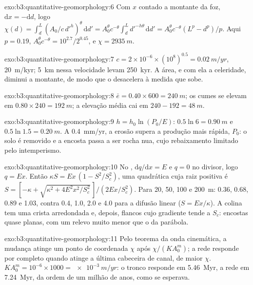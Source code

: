 \begin{solution}{exo:b3:quantitative-geomorphology:6}
Com $x$ contado a montante da foz, $\mathrm{d}x = -\mathrm{d}d$, logo $\chi(d)
= \int_d^L (A_0/c\,d'^{h})^{\theta}\,\mathrm{d}d' = A_0^{\theta} c^{-\theta}
\int_d^L d'^{-h\theta}\,\mathrm{d}d' = A_0^{\theta}c^{-\theta}(L^p -
d^p)/p$. Aqui $p = 0.19$, $A_0^{\theta}c^{-\theta} = 10^{2.7}/2^{0.45}$,
e $\chi = \qty{2935}{m}$.
\end{solution}

\begin{solution}{exo:b3:quantitative-geomorphology:7}
$c = 2\times10^{-6}\times(10^8)^{0.5} = \qty{0.02}{m/yr}$, \qty{20}{m/kyr};
\qty{5}{km} nessa velocidade levam \qty{250}{kyr}. A área, e com ela a
celeridade, diminui a montante, de modo que o  desacelera à medida que sobe.
\end{solution}

\begin{solution}{exo:b3:quantitative-geomorphology:8}
$\bar e = 0.40\times600 = \qty{240}{m}$; os cumes se elevam em $0.80\times240 =
\qty{192}{m}$; a elevação média cai em $240 - 192 = \qty{48}{m}$.
\end{solution}

\begin{solution}{exo:b3:quantitative-geomorphology:9}
$h = h_0\ln(P_0/E)$: $0.5\ln 6 = \qty{0.90}{m}$ e $0.5\ln1.5 =
\qty{0.20}{m}$. A \qty{0.4}{mm/yr}, a erosão supera a produção mais rápida,
$P_0$: o solo é removido e a encosta passa a ser rocha nua, cujo rebaixamento
limitado pelo intemperismo.
\end{solution}

\begin{solution}{exo:b3:quantitative-geomorphology:10}
No , $\mathrm{d}q/\mathrm{d}x = E$ e $q = 0$ no divisor, logo
$q = E x$. Então $\kappa S = E x\,(1 - S^2/S_c^2)$, uma quadrática cuja
raiz positiva é $S = [-\kappa + \sqrt{\kappa^2 + 4E^2x^2/S_c^2}\,]/(2Ex/S_c^2)$. Para
20, 50, 100 e \qty{200}{m}: 0.36, 0.68, 0.89 e 1.03, contra 0.4, 1.0,
2.0 e 4.0 para a difusão linear ($S = Ex/\kappa$). A colina tem uma crista arredondada
e, depois, flancos cujo gradiente tende a $S_c$: encostas quase planas, com
um relevo muito menor que o da parábola.
\end{solution}

\begin{solution}{exo:b3:quantitative-geomorphology:11}
Pelo teorema da onda cinemática, a mudança atinge um ponto de coordenada
$\chi$ após $\chi/(KA_0^m)$; a rede responde por completo quando atinge
a última cabeceira de canal, de maior $\chi$. $K A_0^m = 10^{-6}\times
1000 = \qty{e-3}{m/yr}$: o tronco responde em \qty{5.46}{Myr}, a rede
em \qty{7.24}{Myr}, da ordem de um milhão de anos, como se esperava.
\end{solution}

